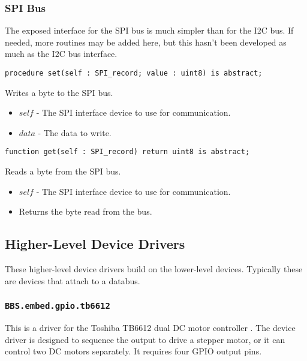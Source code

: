 \documentclass[10pt, openany]{book}
\newcommand{\package}[1]{\texttt{#1}}
\begin{document}
\subsubsection{SPI Bus}
The exposed interface for the SPI bus is much simpler than for the I2C bus.  If needed, more routines may be added here, but this hasn't been developed as much as the I2C bus interface.
\begin{lstlisting}
procedure set(self : SPI_record; value : uint8) is abstract;
\end{lstlisting}
Writes a byte to the SPI bus.
\begin{itemize}
  \item $self$ - The SPI interface device to use for communication.
  \item $data$ - The data to write.
\end{itemize}
\begin{lstlisting}
function get(self : SPI_record) return uint8 is abstract;
\end{lstlisting}
Reads a byte from the SPI bus.
\begin{itemize}
  \item $self$ - The SPI interface device to use for communication.
  \item Returns the byte read from the bus.
\end{itemize}

\subsection{Higher-Level Device Drivers}
These higher-level device drivers build on the lower-level devices.  Typically these are devices that attach to a databus.

\subsubsection{\package{BBS.embed.gpio.tb6612}}
This is a driver for the Toshiba TB6612 dual DC motor controller \cite{TB6612}.  The device driver is designed to sequence the output to drive a stepper motor, or it can control two DC motors separately.  It requires four GPIO output pins.
\end{document}
